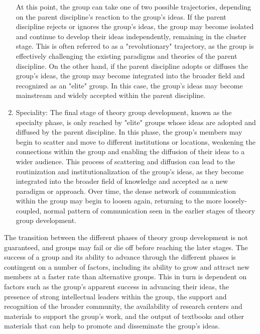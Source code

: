 \begin{enumerate}
At this point, the group can take one of two possible trajectories, depending on the parent discipline's reaction to the group's ideas. If the parent discipline rejects or ignores the group's ideas, the group may become isolated and continue to develop their ideas independently, remaining in the cluster stage. This is often referred to as a "revolutionary" trajectory, as the group is effectively challenging the existing paradigms and theories of the parent discipline. On the other hand, if the parent discipline adopts or diffuses the group's ideas, the group may become integrated into the broader field and recognized as an "elite" group. In this case, the group's ideas may become mainstream and widely accepted within the parent discipline.

\item Speciality: The final stage of theory group development, known as the specialty phase, is only reached by "elite" groups whose ideas are adopted and diffused by the parent discipline. In this phase, the group's members may begin to scatter and move to different institutions or locations, weakening the connections within the group and enabling the diffusion of their ideas to a wider audience. This process of scattering and diffusion can lead to the routinization and institutionalization of the group's ideas, as they become integrated into the broader field of knowledge and accepted as a new paradigm or approach. Over time, the dense network of communication within the group may begin to loosen again, returning to the more loosely-coupled, normal pattern of communication seen in the earlier stages of theory group development.

\end{enumerate}

The transition between the different phases of theory group development is not guaranteed, and groups may fail or die off before reaching the later stages. The success of a group and its ability to advance through the different phases is contingent on a number of factors, including its ability to grow and attract new members at a faster rate than alternative groups. This in turn is dependent on factors such as the group's apparent success in advancing their ideas, the presence of strong intellectual leaders within the group, the support and recognition of the broader community, the availability of research centers and materials to support the group's work, and the output of textbooks and other materials that can help to promote and disseminate the group's ideas.



